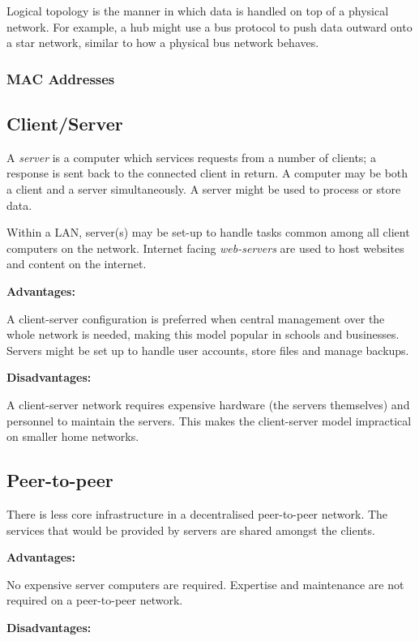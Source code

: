 \documentclass[10pt]{article}
\begin{document}
Logical topology is the manner in which data is handled on top of a physical network. For example, a hub might use a bus protocol to push data outward onto a star network, similar to how a physical bus network behaves.

\subsubsection{MAC Addresses}
\label{sec:org5beb9a4}
\subsection{Client/Server}
\label{sec:orgd2d84e8}

A \emph{server} is a computer which services requests from a number of clients; a response is sent back to the connected client in return. A computer may be both a client and a server simultaneously. A server might be used to process or store data.

Within a LAN, server(s) may be set-up to handle tasks common among all client computers on the network. Internet facing \emph{web-servers} are used to host websites and content on the internet.

\textbf{Advantages:}

A client-server configuration is preferred when central management over the whole network is needed, making this model popular in schools and businesses. Servers might be set up to handle user accounts, store files and manage backups.

\textbf{Disadvantages:}

A client-server network requires expensive hardware (the servers themselves) and personnel to maintain the servers. This makes the client-server model impractical on smaller home networks.

\subsection{Peer-to-peer}
\label{sec:orgf8603f5}

There is less core infrastructure in a decentralised peer-to-peer network. The services that would be provided by servers are shared amongst the clients.

\textbf{Advantages:}

No expensive server computers are required. Expertise and maintenance are not required on a peer-to-peer network.

\textbf{Disadvantages:}
\end{document}
